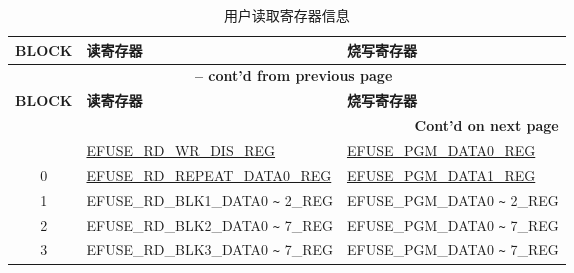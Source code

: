\begin{longtable}[c]{|c|l|l|}
\caption{用户读取寄存器信息}
\label{tab:efuse-softw-read-para}
\\\hline
    \rowcolor{lightgray}
        \textbf{BLOCK} & \textbf{读寄存器} & \textbf{烧写寄存器}\\
    \endfirsthead
    
    \multicolumn{3}{c}{\bfseries \tablename\ \thetable{} -- cont'd from previous page}\\\hline
    
    \rowcolor{lightgray}
        \textbf{BLOCK} & \textbf{读寄存器} & \textbf{烧写寄存器}\\
    \endhead
    
    \multicolumn{3}{r}{\textbf{Cont'd on next page}} \\
    \endfoot
    \endlastfoot
    \hline
0  & \hyperref[regdesc:EFUSERDWRDISREG]{EFUSE\_RD\_WR\_DIS\_REG} & \hyperref[regdesc:EFUSEPGMDATA0REG]{EFUSE\_PGM\_DATA0\_REG} \\\hline
0  & \hyperref[regdesc:EFUSERDREPEATDATA0REG]{EFUSE\_RD\_REPEAT\_DATA0\_REG} & \hyperref[regdesc:EFUSEPGMDATA1REG]{EFUSE\_PGM\_DATA1\_REG} \\\hline
1  & EFUSE\_RD\_BLK1\_DATA0 \verb+~+ 2\_REG & EFUSE\_PGM\_DATA0 \verb+~+ 2\_REG \\\hline
2  & EFUSE\_RD\_BLK2\_DATA0 \verb+~+ 7\_REG & EFUSE\_PGM\_DATA0 \verb+~+ 7\_REG \\\hline
3  & EFUSE\_RD\_BLK3\_DATA0 \verb+~+ 7\_REG & EFUSE\_PGM\_DATA0 \verb+~+ 7\_REG \\ \hline
\end{longtable}
